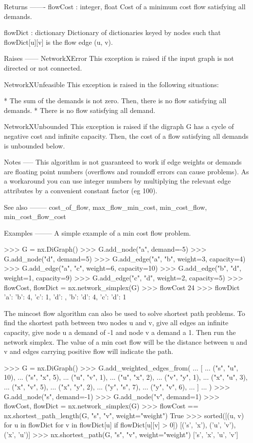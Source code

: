\begin{DoxyVerb}
Returns
-------
flowCost : integer, float
    Cost of a minimum cost flow satisfying all demands.

flowDict : dictionary
    Dictionary of dictionaries keyed by nodes such that
    flowDict[u][v] is the flow edge (u, v).

Raises
------
NetworkXError
    This exception is raised if the input graph is not directed or
    not connected.

NetworkXUnfeasible
    This exception is raised in the following situations:

        * The sum of the demands is not zero. Then, there is no
          flow satisfying all demands.
        * There is no flow satisfying all demand.

NetworkXUnbounded
    This exception is raised if the digraph G has a cycle of
    negative cost and infinite capacity. Then, the cost of a flow
    satisfying all demands is unbounded below.

Notes
-----
This algorithm is not guaranteed to work if edge weights or demands
are floating point numbers (overflows and roundoff errors can
cause problems). As a workaround you can use integer numbers by
multiplying the relevant edge attributes by a convenient
constant factor (eg 100).

See also
--------
cost_of_flow, max_flow_min_cost, min_cost_flow, min_cost_flow_cost

Examples
--------
A simple example of a min cost flow problem.

>>> G = nx.DiGraph()
>>> G.add_node("a", demand=-5)
>>> G.add_node("d", demand=5)
>>> G.add_edge("a", "b", weight=3, capacity=4)
>>> G.add_edge("a", "c", weight=6, capacity=10)
>>> G.add_edge("b", "d", weight=1, capacity=9)
>>> G.add_edge("c", "d", weight=2, capacity=5)
>>> flowCost, flowDict = nx.network_simplex(G)
>>> flowCost
24
>>> flowDict
{'a': {'b': 4, 'c': 1}, 'd': {}, 'b': {'d': 4}, 'c': {'d': 1}}

The mincost flow algorithm can also be used to solve shortest path
problems. To find the shortest path between two nodes u and v,
give all edges an infinite capacity, give node u a demand of -1 and
node v a demand a 1. Then run the network simplex. The value of a
min cost flow will be the distance between u and v and edges
carrying positive flow will indicate the path.

>>> G = nx.DiGraph()
>>> G.add_weighted_edges_from(
...     [
...         ("s", "u", 10),
...         ("s", "x", 5),
...         ("u", "v", 1),
...         ("u", "x", 2),
...         ("v", "y", 1),
...         ("x", "u", 3),
...         ("x", "v", 5),
...         ("x", "y", 2),
...         ("y", "s", 7),
...         ("y", "v", 6),
...     ]
... )
>>> G.add_node("s", demand=-1)
>>> G.add_node("v", demand=1)
>>> flowCost, flowDict = nx.network_simplex(G)
>>> flowCost == nx.shortest_path_length(G, "s", "v", weight="weight")
True
>>> sorted([(u, v) for u in flowDict for v in flowDict[u] if flowDict[u][v] > 0])
[('s', 'x'), ('u', 'v'), ('x', 'u')]
>>> nx.shortest_path(G, "s", "v", weight="weight")
['s', 'x', 'u', 'v']


\end{DoxyVerb}
